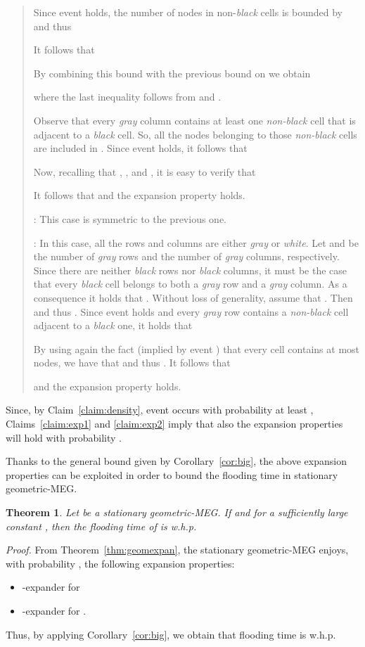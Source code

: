 \documentclass[10pt,a4paper]{article}
\newtheorem{theorem}[definition]{Theorem}
\newcommand{\proof}{\noindent\textit{Proof. }}
\newcommand{\qed}{\hspace{\stretch{1}}}
\begin{document}
\begin{quote}
Since event  holds, the number of nodes in non-\emph{black} cells is bounded by  and thus

It follows that

By combining this bound with the previous bound on  we obtain

where the last inequality follows from  and .

\noindent Observe that every \emph{gray} column contains at least one \emph{non-black} cell that is adjacent
to a \emph{black} cell. So, all the nodes belonging to those \emph{non-black} cells are included in
. Since event  holds, it follows that

Now, recalling that , , and , it is easy to verify that

It follows that  and the expansion property holds.

\smallskip {}: This case is symmetric to the previous one.

\smallskip {}: In this case, all the rows and columns are either \emph{gray} or
\emph{white}. Let  and  be the number of \emph{gray} rows and the number of \emph{gray}
columns, respectively. Since there are neither \emph{black} rows nor \emph{black} columns, it must be
the case that every \emph{black} cell belongs to both a \emph{gray} row and a \emph{gray} column. As a
consequence it holds that . Without loss of generality, assume
that . Then  and thus . Since event
 holds and every \emph{gray} row contains a \emph{non-black} cell adjacent to a \emph{black}
one, it holds that

By using again the fact (implied by event ) that every cell contains at most  nodes, we have that  and thus . It follows that

and the expansion property holds.
\qed
\end{quote}

\noindent Since, by Claim~\ref{claim:density}, event  occurs with probability at least , Claims~\ref{claim:exp1} and \ref{claim:exp2} imply that also the expansion properties will hold with probability .
\qed

\noindent Thanks to the general bound given by Corollary~\ref{cor:big}, the above expansion properties can be exploited in order to bound the flooding time in stationary geometric-MEG.

\begin{theorem}\label{thm:geoflooding}
Let  be a stationary geometric-MEG. If  and  for a sufficiently large constant , then the flooding time of  is w.h.p.

\end{theorem}
\proof From Theorem~\ref{thm:geomexpan}, the stationary geometric-MEG 
enjoys, with probability , the following expansion properties:
\begin{itemize}
\item -expander for 
\item -expander for .
\end{itemize}
Thus, by applying Corollary~\ref{cor:big}, we obtain that flooding time is w.h.p.
\end{document}
